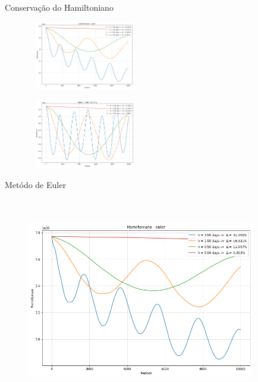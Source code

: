 \documentclass{beamer}
\begin{document}
    \begin{frame}{Conservação do Hamiltoniano}

      \begin{figure}[h]
        \vspace{-0.5cm}
        \includegraphics[width=50mm, height = 30mm]{resources/h_euler.png}
      \end{figure}

      \begin{figure}[h]
        \vspace{-0.5cm}
        \includegraphics[width=50mm, height = 30mm]{resources/h_leap.png}
      \end{figure}

    \end{frame}

    \begin{frame}{Metódo de Euler}

      \begin{figure}[h]
        \vspace{-0.5cm}
        \includegraphics[width=100mm, height = 90mm]{resources/h_euler.png}
      \end{figure}

    \end{frame}
\end{document}

